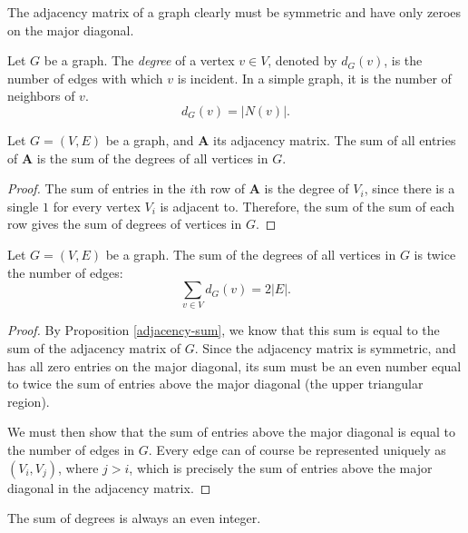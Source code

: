 \begin{rmk}
    The adjacency matrix of a graph clearly must be symmetric and have only zeroes on the major diagonal.
\end{rmk}

\begin{defn}
    Let $G$ be a graph. The \emph{degree} of a vertex $v \in V$, denoted by $d_G(v)$, is the number of edges with which $v$ is incident. In a simple graph, it is the number of neighbors of $v$. \[d_G(v) = |N(v)|.\]
\end{defn}

\begin{prop}\label{adjacency-sum}
    Let $G = (V, E)$ be a graph, and $\bm{A}$ its adjacency matrix. The sum of all entries of $\bm{A}$ is the sum of the degrees of all vertices in $G$.
\end{prop}

\begin{proof}
    The sum of entries in the $i$th row of $\bm{A}$ is the degree of $V_i$, since there is a single $1$ for every vertex $V_i$ is adjacent to. Therefore, the sum of the sum of each row gives the sum of degrees of vertices in $G$.
\end{proof}

\begin{thm}\label{sum-degrees-is-twice-edges}
    Let $G = (V, E)$ be a graph. The sum of the degrees of all vertices in $G$ is twice the number of edges:
    \[\sum_{v\in V}d_G(v) = 2|E|.\]
\end{thm}

\begin{proof}
    By Proposition \ref{adjacency-sum}, we know that this sum is equal to the sum of the adjacency matrix of $G$. Since the adjacency matrix is symmetric, and has all zero entries on the major diagonal, its sum must be an even number equal to twice the sum of entries above the major diagonal (the upper triangular region).

    We must then show that the sum of entries above the major diagonal is equal to the number of edges in $G$. Every edge can of course be represented uniquely as $(V_i, V_j)$, where $j > i$, which is precisely the sum of entries above the major diagonal in the adjacency matrix.
\end{proof}

\begin{cor}\label{sum-degrees-is-even}
    The sum of degrees is always an even integer.
\end{cor}

